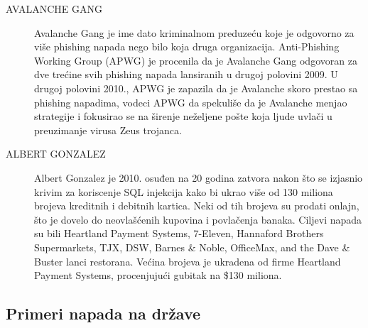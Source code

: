 \documentclass[a4paper]{article}
\begin{document}
{\begin{description}
\item[AVALANCHE GANG] Avalanche Gang je ime dato kriminalnom preduzeću koje je odgovorno za više phishing napada nego bilo koja druga organizacija. Anti-Phishing Working Group (APWG) je procenila da je Avalanche Gang odgovoran za dve trećine svih phishing napada lansiranih u drugoj polovini 2009. U drugoj polovini 2010., APWG je zapazila da je Avalanche skoro prestao sa phishing napadima, vodeci APWG da spekuliše da je Avalanche menjao strategije i fokusirao se na širenje neželjene pošte koja ljude uvlači u preuzimanje virusa Zeus trojanca.
\item[ALBERT GONZALEZ] Albert Gonzalez je 2010. osuđen na 20 godina zatvora nakon što se izjasnio krivim za koriscenje SQL injekcija kako bi ukrao više od 130 miliona brojeva kreditnih i debitnih kartica. Neki od tih brojeva su prodati onlajn, što je dovelo do neovlašćenih kupovina i povlačenja banaka. Ciljevi napada su bili Heartland Payment Systems,  7-Eleven,  Hannaford Brothers Supermarkets,  TJX,  DSW,  Barnes \& Noble, OfficeMax, and the Dave \& Buster lanci restorana. Većina brojeva je ukradena od firme Heartland Payment Systems, procenjujući gubitak na \$130 miliona.
\end{description}

\subsection{Primeri napada na države}
\label{subsec:primeri_napada_drzave}

}
\end{document}
